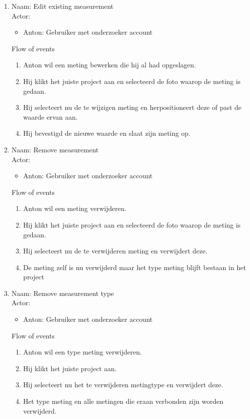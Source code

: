 \begin{enumerate}
\item   Naam: Edit existing measurement  \\
	Actor:
	\begin{itemize}
		\item Anton: Gebruiker met onderzoeker account
	\end{itemize}
	Flow of events
	\begin{enumerate}
		\item Anton wil een meting bewerken die hij al had opgeslagen.
		\item Hij klikt het juiste project aan en selecteerd de foto waarop de meting is gedaan.
		\item Hij selecteert nu de te wijzigen meting en herpositioneert deze of past de waarde ervan aan.
		\item Hij bevestigd de nieuwe waarde en slaat zijn meting op.
	\end{enumerate}


\item   Naam: Remove measurement  \\
	Actor:
	\begin{itemize}
		\item Anton: Gebruiker met onderzoeker account
	\end{itemize}
	Flow of events
	\begin{enumerate}
		\item Anton wil een meting verwijderen.
		\item Hij klikt het juiste project aan en selecteerd de foto waarop de meting is gedaan.
		\item Hij selecteert nu de te verwijderen meting en verwijdert deze.
		\item De meting zelf is nu verwijderd maar het type meting blijft bestaan in het project
	\end{enumerate}


\item   Naam: Remove measurement type  \\
	Actor:
	\begin{itemize}
		\item Anton: Gebruiker met onderzoeker account
	\end{itemize}
	Flow of events
	\begin{enumerate}
		\item Anton wil een type meting verwijderen.
		\item Hij klikt het juiste project aan.
		\item Hij selecteert nu het te verwijderen metingtype en verwijdert deze.
		\item Het type meting en alle metingen die eraan verbonden zijn worden verwijderd.
	\end{enumerate}



\end{enumerate}

